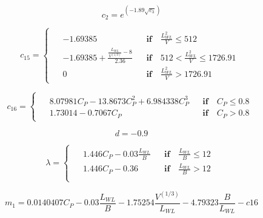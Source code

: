 \begin{equation}\label{eqn:c2}
    c_2 = e^{(-1.89\sqrt{c_3})}
\end{equation}

\begin{equation}
    \label{eqn:c15}
    c_{15} =
    \begin{cases}
        \begin{aligned}
            & -1.69385 && \textbf{if} \quad \frac{L_{WL}^2}{V} \leqslant 512 \\
            & -1.69385 + \frac{\frac{L_{WL}}{V^{(1/3)}}-8}{2.36}&& \textbf{if} \quad 512 < \frac{L_{WL}^2}{V} \leqslant 1726.91 \\
            & 0 && \textbf{if} \quad \frac{L_{WL}^2}{V} > 1726.91
        \end{aligned}
    \end{cases}
\end{equation}

\begin{equation}
    \label{eqn:c16}
    c_{16} = 
    \begin{cases}
        \begin{aligned}
            & 8.07981C_P - 13.8673C_P^2 + 6.984338C_P^3 && \textbf{if} \quad C_P \leqslant 0.8 \\
            & 1.73014 - 0.7067C_P && \textbf{if} \quad C_P > 0.8
        \end{aligned}
    \end{cases}
\end{equation}

\begin{equation}
    \label{eqn:d}
    d = -0.9
\end{equation}

\begin{equation}
    \label{eqn:lambda}
    \lambda = 
    \begin{cases}
        \begin{aligned}
            &1.446C_P - 0.03\frac{L_{WL}}{B} && \textbf{if} \quad \frac{L_{WL}}{B} \leqslant 12 \\
            &1.446C_P - 0.36 && \textbf{if} \quad \frac{L_{WL}}{B} > 12 \\
        \end{aligned}
    \end{cases}
\end{equation}

\begin{equation}
    \label{eqn:m1}
    m_1 = 0.0140407C_P - 0.03\frac{L_{WL}}{B} - 1.75254\frac{V^{(1/3)}}{L_{WL}} - 4.79323\frac{B}{L_{WL}} - c{16}
\end{equation}

